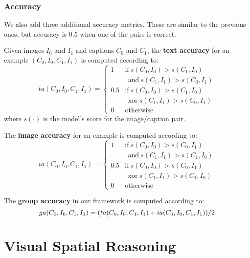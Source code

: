 \subsubsection{Accuracy}

We also add three additional accuracy metrics. These are similar to the previous ones, but accuracy is 0.5 when one of the pairs is correct.

Given images $I_0$ and $I_{1}$ and captions $C_{0}$ and $C_{1}$, the \textbf{text accuracy} for an example $(C_{0},I_{0},C_{1},I_{1})$ is computed according to:
\begin{equation}\label{eq:text-accuracy}
        ta(C_{0},I_{0},C_{1},I_{1})= 
    \begin{cases}
        1 & \text{if}\  s(C_{0}, I_{0}) > s(C_{1}, I_{0}) \\
        & \ \ \text{and}\ s(C_{1}, I_{1}) > s(C_{0}, I_{1}) \\
        0.5 & \text{if}\  s(C_{0}, I_{0}) > s(C_{1}, I_{0}) \\
        & \ \ \text{xor}\ s(C_{1}, I_{1}) > s(C_{0}, I_{1}) \\
        0              & \text{otherwise}
    \end{cases}
\end{equation}
where $s(\cdot)$ is the model's score for the image/caption pair.

The \textbf{image accuracy} for an example is computed according to:
\begin{equation}\label{eq:image-accuracy}
        ia(C_{0},I_{0},C_{1},I_{1})= 
    \begin{cases}
        1 & \text{if}\  s(C_{0}, I_{0}) > s(C_{0}, I_{1})\\
        & \ \ \text{and}\ s(C_{1}, I_{1}) > s(C_{1}, I_{0}) \\
        0.5 & \text{if}\  s(C_{0}, I_{0}) > s(C_{0}, I_{1})\\
        & \ \ \text{xor}\ s(C_{1}, I_{1}) > s(C_{1}, I_{0}) \\
        0              & \text{otherwise}
    \end{cases}
\end{equation}

The \textbf{group accuracy} in our framework is computed according to:
\begin{equation}\label{eq:group-accuracy}
        ga(C_{0},I_{0},C_{1},I_{1})= 
        (ta(C_{0},I_{0},C_{1},I_{1}) + ia(C_{0},I_{0},C_{1},I_{1})) / 2\\
\end{equation}

\section{Visual Spatial Reasoning}